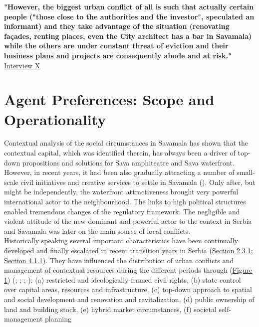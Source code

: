 \documentclass[11pt]{report}
\begin{document}
\textbf{"However, the biggest urban conflict of all is such that actually certain people ("those close to the authorities and the investor", speculated an informant)  and they take advantage of the situation (renovating façades, renting places, even the City architect has a bar in Savamala) while the others are under constant threat of eviction and their business plans and projects are consequently abode and at risk."} \href{InterviewX}{Interview X}

\section{Agent Preferences: Scope and Operationality}

Contextual analysis of the social circumstances in Savamala has shown that the contextual capital, which was identified therein, has always been a driver of top-down propositions and solutions for Sava amphiteatre and Sava waterfront.
However, in recent years, it had been also  gradually attracting a number of small-scale civil initiatives and creative services to settle in Savamala (\citealt{cvetinovic_engine_2013}).
Only after, but might be independently, the waterfront attractiveness brought very powerful international actor to the neighbourhood.
The links to high political structures enabled tremendous changes of the regulatory framework.
The negligible and violent attitude of the new dominant and powerful actor to the context in Serbia and Savamala was later on the main source of local conflicts. 
\\

Historically speaking several important characteristics have been continually developed and finally escalated in recent transition years in Serbia (\href{Section 2.3.1}{Section 2.3.1}; \href{Section 4.1.1}{Section 4.1.1}). They have influenced the distribution of urban conflicts and management of contextual resources during the different periods through (\href{Figure 1}{Figure 1}) (\citealt{simmie_self-management_1989}; \citealt{vujovic_belgrades_2007}; \citealt{petrovic_cities_2009}; \citealt{vujosevic_postsocijalisticka_2010)}): 
(a) restricted and ideologically-framed civil rights, 
(b) state control over capital areas, resources and infrastructure,
(c) top-down approach to spatial and social development and renovation and revitalization,
(d) public ownership of land and building stock,
(e) hybrid market circumstances,
(f) societal self-management planning
\\
\end{document}

